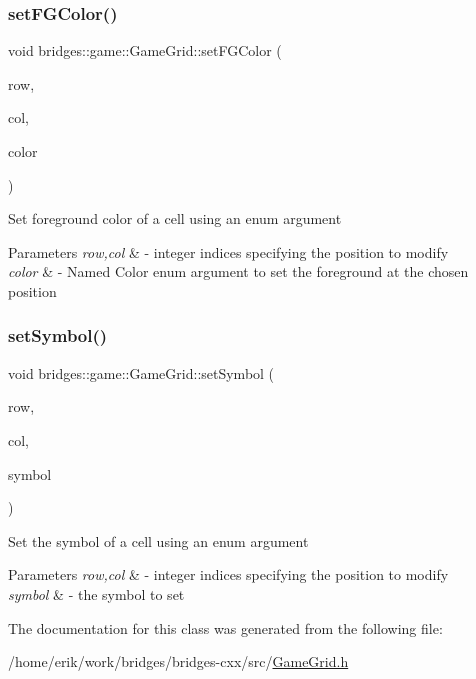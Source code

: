 \subsubsection{\texorpdfstring{set\+F\+G\+Color()}{setFGColor()}}
{\footnotesize\ttfamily void bridges\+::game\+::\+Game\+Grid\+::set\+F\+G\+Color (\begin{DoxyParamCaption}\item[{int}]{row,  }\item[{int}]{col,  }\item[{\hyperlink{namespacebridges_1_1game_afaa832a4322b25b6a4ebfba832f10f26}{Named\+Color}}]{color }\end{DoxyParamCaption})\hspace{0.3cm}{\ttfamily [inline]}}

Set foreground color of a cell using an enum argument


\begin{DoxyParams}{Parameters}
{\em row,col} & -\/ integer indices specifying the position to modify \\
\hline
{\em color} & -\/ Named Color enum argument to set the foreground at the chosen position \\
\hline
\end{DoxyParams}
\mbox{\label{classbridges_1_1game_1_1_game_grid_aaca03d00599251edb5312e9ba51dd62e}} 
\subsubsection{\texorpdfstring{set\+Symbol()}{setSymbol()}}
{\footnotesize\ttfamily void bridges\+::game\+::\+Game\+Grid\+::set\+Symbol (\begin{DoxyParamCaption}\item[{int}]{row,  }\item[{int}]{col,  }\item[{\hyperlink{namespacebridges_1_1game_ab9a19c7ab6e2ebac2f95180e21733487}{Named\+Symbol}}]{symbol }\end{DoxyParamCaption})\hspace{0.3cm}{\ttfamily [inline]}}

Set the symbol of a cell using an enum argument


\begin{DoxyParams}{Parameters}
{\em row,col} & -\/ integer indices specifying the position to modify \\
\hline
{\em symbol} & -\/ the symbol to set \\
\hline
\end{DoxyParams}


The documentation for this class was generated from the following file\+:\begin{DoxyCompactItemize}
\item 
/home/erik/work/bridges/bridges-\/cxx/src/\hyperlink{_game_grid_8h}{Game\+Grid.\+h}\end{DoxyCompactItemize}
